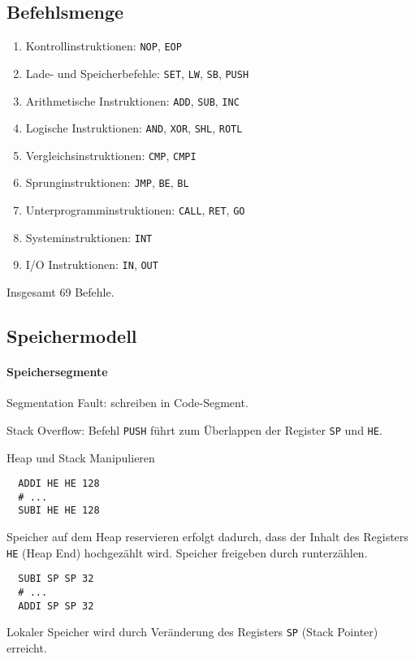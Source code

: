 \subsection{Befehlsmenge}

\begin{frame}{\insertsubsection}
\begin{enumerate}
  \item Kontrollinstruktionen: \texttt{NOP}, \texttt{EOP}
  \item Lade- und Speicherbefehle: 
        \texttt{SET}, \texttt{LW}, \texttt{SB}, \texttt{PUSH}
  \item Arithmetische Instruktionen:
        \texttt{ADD}, \texttt{SUB}, \texttt{INC}
  \item Logische Instruktionen:
        \texttt{AND}, \texttt{XOR}, \texttt{SHL}, \texttt{ROTL}
  \item Vergleichsinstruktionen:
        \texttt{CMP}, \texttt{CMPI}
  \item Sprunginstruktionen:
        \texttt{JMP}, \texttt{BE}, \texttt{BL}
  \item Unterprogramminstruktionen:
        \texttt{CALL}, \texttt{RET}, \texttt{GO}
  \item Systeminstruktionen:
        \texttt{INT}
  \item I/O Instruktionen:
        \texttt{IN}, \texttt{OUT}
\end{enumerate}
Insgesamt 69 Befehle.
\end{frame}



\subsection{Speichermodell}

\begin{frame}{\insertsubsection}
 \framesubtitle{Speichersegmente}
 \begin{center}
  
 \end{center}
 Segmentation Fault: schreiben in Code-Segment.
 
 Stack Overflow: Befehl \texttt{PUSH} führt zum Überlappen der Register
\texttt{SP} und \texttt{HE}.
\end{frame}


\begin{frame}[fragile]{Heap und Stack Manipulieren}
 \begin{lstlisting}
  ADDI HE HE 128
  # ...
  SUBI HE HE 128
 \end{lstlisting}
 Speicher auf dem Heap reservieren erfolgt dadurch, dass der Inhalt des
 Registers \texttt{HE} (Heap End) hochgezählt wird. Speicher freigeben durch
 runterzählen.
 
 \begin{lstlisting}
  SUBI SP SP 32
  # ...
  ADDI SP SP 32
 \end{lstlisting}
 Lokaler Speicher wird durch Veränderung des Registers \texttt{SP} (Stack
 Pointer) erreicht.
\end{frame}



